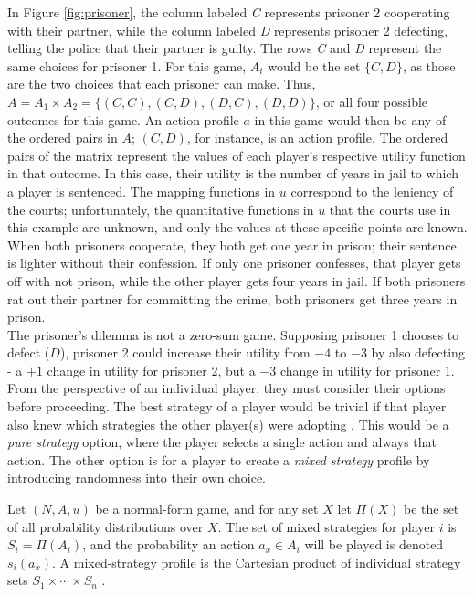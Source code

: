 In Figure \ref{fig:prisoner}, the column labeled \textit{C} represents prisoner 2 cooperating with their partner, while the column labeled \textit{D} represents prisoner 2 defecting, telling the police that their partner is guilty. The rows \textit{C} and \textit{D} represent the same choices for prisoner 1. For this game, $A_i$ would be the set $\{C, D\}$, as those are the two choices that each prisoner can make. Thus, $A=A_1\times A_2 = \{(C, C), (C, D), (D, C), (D, D)\}$, or all four possible outcomes for this game. An action profile $a$ in this game would then be any of the ordered pairs in $A$; $(C,D)$, for instance, is an action profile. The ordered pairs of the matrix represent the values of each player's respective utility function in that outcome. In this case, their utility is the number of years in jail to which a player is sentenced. The mapping functions in $u$ correspond to the leniency of the courts; unfortunately, the quantitative functions in $u$ that the courts use in this example are unknown, and only the values at these specific points are known. When both prisoners cooperate, they both get one year in prison; their sentence is lighter without their confession. If only one prisoner confesses, that player gets off with not prison, while the other player gets four years in jail. If both prisoners rat out their partner for committing the crime, both prisoners get three years in prison.\\

The prisoner's dilemma is not a zero-sum game. Supposing prisoner 1 chooses to defect ($D$), prisoner 2 could increase their utility from $-4$ to $-3$ by also defecting - a $+1$ change in utility for prisoner 2, but a $-3$ change in utility for prisoner 1.\\

From the perspective of an individual player, they must consider their options before proceeding. The best strategy of a player would be trivial if that player also knew which strategies the other player(s) were adopting \cite{shoh09}. This would be a \textit{pure strategy} option, where the player selects a single action and always that action. The other option is for a player to create a \textit{mixed strategy} profile by introducing randomness into their own choice.

\begin{define}
  Let $(N,A,u)$ be a normal-form game, and for any set $X$ let $\Pi(X)$ be the set of all probability distributions over $X$. The set of mixed strategies for player $i$ is $S_i = \Pi(A_i)$, and the probability an action $a_x\in A_i$ will be played is denoted $s_i(a_x)$. A mixed-strategy profile is the Cartesian product of individual strategy sets $S_1\times\cdots\times S_n$ \cite{shoh09}.
\end{define}


